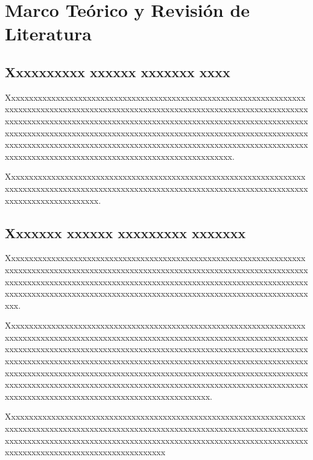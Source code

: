 \chapter{Marco Teórico y Revisión de Literatura}

\section{Xxxxxxxxxx xxxxxx xxxxxxx xxxx}

Xxxxxxxxxxxxxxxxxxxxxxxxxxxxxxxxxxxxxxxxxxxxxxxxxxxxxxxxxxxxxxxxxxxxxxxxxxxxxxxxxxxxxxxxxxxxxxxxxxxxxxxxxxxxxxxxxxxxxxxxxxxxxxxxxxxxxxxxxxxxxxxxxxxxxxxxxxxxxxxxxxxxxxxxxxxxxxxxxxxxxxxxxxxxxxxxxxxxxxxxxxxxxxxxxxxxxxxxxxxxxxxxxxxxxxxxxxxxxxxxxxxxxxxxxxxxxxxxxxxxxxxxxxxxxxxxxxxxxxxxxxxxxxxxxxxxxxxxxxxxxxxxxxxxxxxxxxxxxxxxxxxxxxxxxxxxxxxxxxxxxxxxxxxxxxxxxxxxxxxxxxxxxxxxxxxxxxxxxxxxxxxxxxxxxx.

Xxxxxxxxxxxxxxxxxxxxxxxxxxxxxxxxxxxxxxxxxxxxxxxxxxxxxxxxxxxxxxxxxxxxxxxxxxxxxxxxxxxxxxxxxxxxxxxxxxxxxxxxxxxxxxxxxxxxxxxxxxxxxxxxxxxxxxxxxxxxxxxxxxxxxxxxxxxx.

\section{Xxxxxxx xxxxxx xxxxxxxxx xxxxxxx}

Xxxxxxxxxxxxxxxxxxxxxxxxxxxxxxxxxxxxxxxxxxxxxxxxxxxxxxxxxxxxxxxxxxxxxxxxxxxxxxxxxxxxxxxxxxxxxxxxxxxxxxxxxxxxxxxxxxxxxxxxxxxxxxxxxxxxxxxxxxxxxxxxxxxxxxxxxxxxxxxxxxxxxxxxxxxxxxxxxxxxxxxxxxxxxxxxxxxxxxxxxxxxxxxxxxxxxxxxxxxxxxxxxxxxxxxxxxxxxxxxxxxxxxxxxxxxxxxxxxxxxxxxxxxxxxxxxx.

Xxxxxxxxxxxxxxxxxxxxxxxxxxxxxxxxxxxxxxxxxxxxxxxxxxxxxxxxxxxxxxxxxxxxxxxxxxxxxxxxxxxxxxxxxxxxxxxxxxxxxxxxxxxxxxxxxxxxxxxxxxxxxxxxxxxxxxxxxxxxxxxxxxxxxxxxxxxxxxxxxxxxxxxxxxxxxxxxxxxxxxxxxxxxxxxxxxxxxxxxxxxxxxxxxxxxxxxxxxxxxxxxxxxxxxxxxxxxxxxxxxxxxxxxxxxxxxxxxxxxxxxxxxxxxxxxxxxxxxxxxxxxxxxxxxxxxxxxxxxxxxxxxxxxxxxxxxxxxxxxxxxxxxxxxxxxxxxxxxxxxxxxxxxxxxxxxxxxxxxxxxxxxxxxxxxxxxxxxxxxxxxxxxxxxxxxxxxxxxxxxxxxxxxxxxxxxxxxxxxxxxxxxxxxxxxxxxxxxxxxxxxxxxxxxxxxx.

Xxxxxxxxxxxxxxxxxxxxxxxxxxxxxxxxxxxxxxxxxxxxxxxxxxxxxxxxxxxxxxxxxxxxxxxxxxxxxxxxxxxxxxxxxxxxxxxxxxxxxxxxxxxxxxxxxxxxxxxxxxxxxxxxxxxxxxxxxxxxxxxxxxxxxxxxxxxxxxxxxxxxxxxxxxxxxxxxxxxxxxxxxxxxxxxxxxxxxxxxxxxxxxxxxxxxxxxxxxxxxxxxxxxxxxxxxxxxxxx